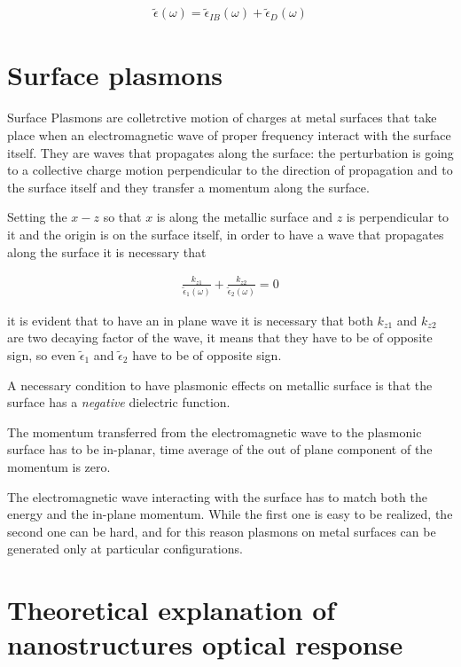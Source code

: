 \begin{eqnarray}
	\widetilde{\epsilon}(\omega) = \widetilde{\epsilon}_{IB}(\omega) + \widetilde{\epsilon}_{D}(\omega)
\end{eqnarray}






\section{Surface plasmons}

Surface Plasmons are colletrctive motion of charges at metal surfaces that take place when an electromagnetic wave of proper frequency interact with the surface itself. They are waves that propagates along the surface: the perturbation is going to a collective charge motion perpendicular to the direction of propagation and to the surface itself and they transfer a momentum along the surface.

Setting the $x-z$ so that $x$ is along the metallic surface and $z$ is perpendicular to it and the origin is on the surface itself, in order to have a wave that propagates along the surface it is necessary that 

\begin{eqnarray}
	\frac{ k_{z1} }{ \widetilde{\epsilon}_1(\omega) } + \frac{ k_{z2} }{ \widetilde{\epsilon}_2(\omega) } = 0
\end{eqnarray}

it is evident that to have an in plane wave it is necessary that both $k_{z1}$ and $k_{z2}$ are two decaying factor of the wave, it means that they have to be of opposite sign, so even $\widetilde{\epsilon}_1$ and $\widetilde{\epsilon}_2$ have to be of opposite sign.

A necessary condition to have plasmonic effects on metallic surface is that the surface has a \emph{negative} dielectric function.

The momentum transferred from the electromagnetic wave to the plasmonic surface has to be in-planar, time average of the out of plane component of the momentum is zero.

The electromagnetic wave interacting with the surface has to match both the energy and the in-plane momentum.
While the first one is easy to be realized, the second one can be hard, and for this reason plasmons on metal surfaces can be generated only at particular configurations.



\section{Theoretical explanation of nanostructures optical response}


